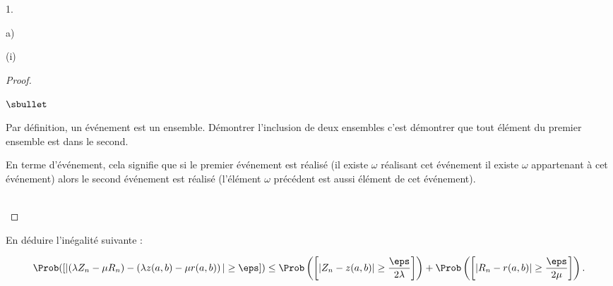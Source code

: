 \begin{noliste}{1.}
\begin{noliste}{a)}
\begin{noliste}{(i)}
\begin{proof}
    \begin{remarkL}{.98}%
      \begin{noliste}{$\sbullet$}
      \item Par définition, un événement est un ensemble. Démontrer
        l'inclusion de deux ensembles c'est démontrer que tout élément
        du premier ensemble est dans le second.
      \item En terme d'événement, cela signifie que si le premier
        événement est réalisé (il existe $\omega$ réalisant cet
        événement \ie il existe $\omega$ appartenant à cet événement)
        alors le second événement est réalisé (l'élément $\omega$
        précédent est aussi élément de cet événement).
      \end{noliste}
    \end{remarkL}~\\[-1.4cm]
  \end{proof}
	
	
	
	\newpage
	
      
    \item En déduire l'inégalité suivante :
    \end{noliste}
    \[
    \Prob([\vert(\lambda Z_n-\mu R_n)-\left(\lambda z(a,b) -\mu
      r(a,b)\right)\vert \geq \eps ]) \leq \Prob\left(\left[ \vert
        Z_n-z(a,b)\vert \geq \dfrac{\eps}{2\lambda}\right]\right) +
    \Prob\left(\left[\vert R_n-r(a,b)\vert \geq
        \dfrac{\eps}{2\mu}\right]\right).
    \]
    

\end{noliste}
\end{noliste}
